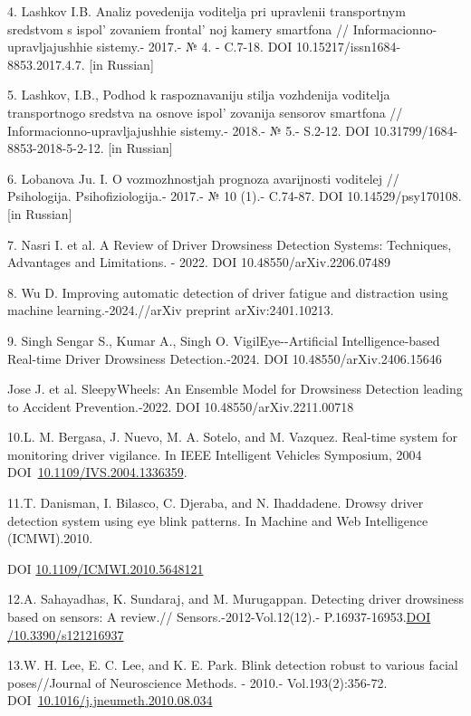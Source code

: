 4. Lashkov I.B. Analiz povedenija voditelja pri upravlenii transportnym
sredstvom s ispol' zovaniem frontal' noj
kamery smartfona // Informacionno-upravljajushhie sistemy.- 2017.- № 4.
- C.7-18. DOI 10.15217/issn1684-8853.2017.4.7. {[}in Russian{]}

5. Lashkov, I.B., Podhod k raspoznavaniju stilja vozhdenija voditelja
transportnogo sredstva na osnove ispol' zovanija sensorov
smartfona // Informacionno-upravljajushhie sistemy.- 2018.- № 5.-
S.2-12. DOI 10.31799/1684-8853-2018-5-2-12. {[}in Russian{]}

6. Lobanova Ju. I. O vozmozhnostjah prognoza avarijnosti voditelej //
Psihologija. Psihofiziologija.- 2017.- № 10 (1).- C.74-87. DOI
10.14529/psy170108. {[}in Russian{]}

7. Nasri I. et al. A Review of Driver Drowsiness Detection Systems:
Techniques, Advantages and Limitations. - 2022. DOI
10.48550/arXiv.2206.07489

8. Wu D. Improving automatic detection of driver fatigue and distraction
using machine learning.-2024.//arXiv preprint arXiv:2401.10213.

9. Singh Sengar S., Kumar A., Singh O. VigilEye-\/-Artificial
Intelligence-based Real-time Driver Drowsiness Detection.-2024. DOI
10.48550/arXiv.2406.15646

Jose J. et al. SleepyWheels: An Ensemble Model for Drowsiness Detection
leading to Accident Prevention.-2022. DOI 10.48550/arXiv.2211.00718

10.L. M. Bergasa, J. Nuevo, M. A. Sotelo, and M. Vazquez. Real-time
system for monitoring driver vigilance. In IEEE Intelligent Vehicles
Symposium, 2004
DOI~\href{https://doi.org/10.1109/IVS.2004.1336359}{10.1109/IVS.2004.1336359}.

11.T. Danisman, I. Bilasco, C. Djeraba, and N. Ihaddadene. Drowsy driver
detection system using eye blink patterns. In Machine and Web
Intelligence (ICMWI).2010.

DOI
\href{http://dx.doi.org/10.1109/ICMWI.2010.5648121}{10.1109/ICMWI.2010.5648121}

12.A. Sahayadhas, K. Sundaraj, and M. Murugappan. Detecting driver
drowsiness based on sensors: A review.// Sensors.-2012-Vol.12(12).-
P.16937-16953.\href{https://doi.org/10.3390/s121216937}{DOI
/10.3390/s121216937}

13.W. H. Lee, E. C. Lee, and K. E. Park. Blink detection robust to
various facial poses//Journal of Neuroscience Methods. - 2010.-
Vol.193(2):356-72.
DOI~\href{https://doi.org/10.1016/j.jneumeth.2010.08.034}{10.1016/j.jneumeth.2010.08.034}

